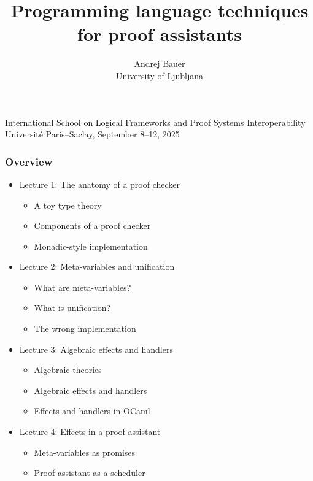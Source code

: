 \documentclass[10pt]{beamer}
\title{Programming language techniques\\ for proof assistants}
\author{Andrej Bauer\\University of Ljubljana}
\date{}
\begin{document}
\begin{frame}
\hbox{}\vfil

\titlepage

\vfil

\begin{center}
\footnotesize
International School on Logical Frameworks and Proof Systems Interoperability \\
Université Paris--Saclay, September 8--12, 2025
\end{center}

\end{frame}


\begin{frame}
  \frametitle{Overview}

  \begin{itemize}
  \item Lecture 1: The anatomy of a proof checker
    \begin{itemize}\footnotesize
    \item A toy type theory
    \item Components of a proof checker
    \item Monadic-style implementation
    \end{itemize}
  \item \pause
    Lecture 2: Meta-variables and unification
    \begin{itemize}\footnotesize
    \item What are meta-variables?
    \item What is unification?
    \item The wrong implementation
    \end{itemize}
  \item \pause
    Lecture 3: Algebraic effects and handlers
    \begin{itemize}\footnotesize
    \item Algebraic theories
    \item Algebraic effects and handlers
    \item Effects and handlers in OCaml
    \end{itemize}
  \item \pause
    Lecture 4: Effects in a proof assistant
    \begin{itemize}\footnotesize
    \item Meta-variables as promises
    \item Proof assistant as a scheduler
    \end{itemize}
  \end{itemize}
\end{frame}
\end{document}
